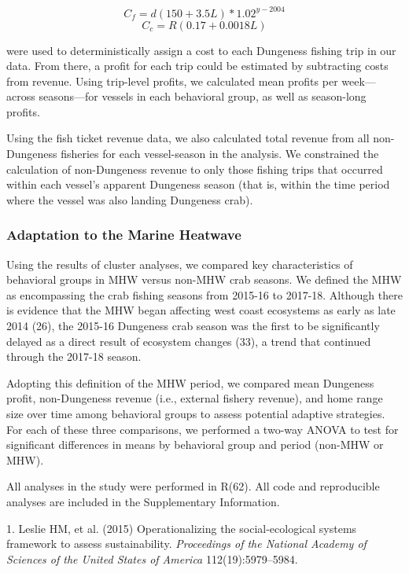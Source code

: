 \documentclass[9pt,twocolumn,twoside,lineno]{pnas-new}
\begin{document}
\[C_f = d(150+3.5L)*1.02^{y-2004}\] \[C_c = R(0.17 + 0.0018L)\]

were used to deterministically assign a cost to each Dungeness fishing
trip in our data. From there, a profit for each trip could be estimated
by subtracting costs from revenue. Using trip-level profits, we
calculated mean profits per week---across seasons---for vessels in each
behavioral group, as well as season-long profits.

Using the fish ticket revenue data, we also calculated total revenue
from all non-Dungeness fisheries for each vessel-season in the analysis.
We constrained the calculation of non-Dungeness revenue to only those
fishing trips that occurred within each vessel's apparent Dungeness
season (that is, within the time period where the vessel was also
landing Dungeness crab).

\hypertarget{adaptation-to-the-marine-heatwave}{%
\subsubsection*{Adaptation to the Marine
Heatwave}\label{adaptation-to-the-marine-heatwave}}

Using the results of cluster analyses, we compared key characteristics
of behavioral groups in MHW versus non-MHW crab seasons. We defined the
MHW as encompassing the crab fishing seasons from 2015-16 to 2017-18.
Although there is evidence that the MHW began affecting west coast
ecosystems as early as late 2014 (26), the 2015-16 Dungeness crab season
was the first to be significantly delayed as a direct result of
ecosystem changes (33), a trend that continued through the 2017-18
season.

Adopting this definition of the MHW period, we compared mean Dungeness
profit, non-Dungeness revenue (i.e., external fishery revenue), and home
range size over time among behavioral groups to assess potential
adaptive strategies. For each of these three comparisons, we performed a
two-way ANOVA to test for significant differences in means by behavioral
group and period (non-MHW or MHW).

All analyses in the study were performed in R(62). All code and
reproducible analyses are included in the Supplementary Information.

\showmatmethods
\showacknow
\pnasbreak

\hypertarget{refs}{}
\leavevmode\hypertarget{ref-Leslie2015}{}%
1. Leslie HM, et al. (2015) Operationalizing the social-ecological
systems framework to assess sustainability. \emph{Proceedings of the
National Academy of Sciences of the United States of America}
112(19):5979--5984.
\end{document}
